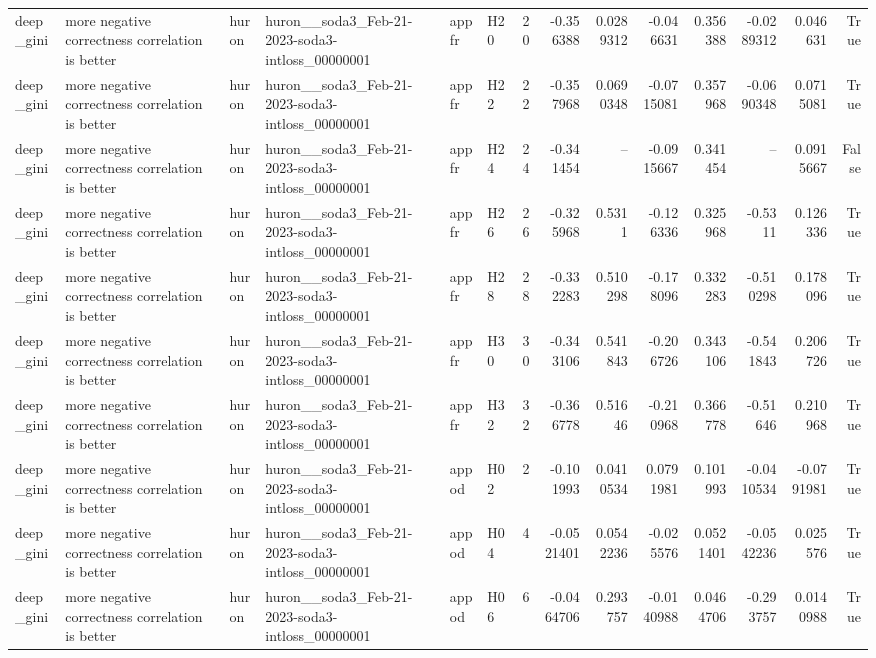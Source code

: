 \begin{longtable}{llllllrrrrrrrr}
deep\_gini & more negative correctness correlation is better & huron & huron\_\_soda3\_Feb-21-2023-soda3-intloss\_00000001 & appfr & H20 & 20 & -0.356388 & 0.0289312 & -0.046631 & 0.356388 & -0.0289312 & 0.046631 & True \\
deep\_gini & more negative correctness correlation is better & huron & huron\_\_soda3\_Feb-21-2023-soda3-intloss\_00000001 & appfr & H22 & 22 & -0.357968 & 0.0690348 & -0.0715081 & 0.357968 & -0.0690348 & 0.0715081 & True \\
deep\_gini & more negative correctness correlation is better & huron & huron\_\_soda3\_Feb-21-2023-soda3-intloss\_00000001 & appfr & H24 & 24 & -0.341454 & -- & -0.0915667 & 0.341454 & -- & 0.0915667 & False \\
deep\_gini & more negative correctness correlation is better & huron & huron\_\_soda3\_Feb-21-2023-soda3-intloss\_00000001 & appfr & H26 & 26 & -0.325968 & 0.5311 & -0.126336 & 0.325968 & -0.5311 & 0.126336 & True \\
deep\_gini & more negative correctness correlation is better & huron & huron\_\_soda3\_Feb-21-2023-soda3-intloss\_00000001 & appfr & H28 & 28 & -0.332283 & 0.510298 & -0.178096 & 0.332283 & -0.510298 & 0.178096 & True \\
deep\_gini & more negative correctness correlation is better & huron & huron\_\_soda3\_Feb-21-2023-soda3-intloss\_00000001 & appfr & H30 & 30 & -0.343106 & 0.541843 & -0.206726 & 0.343106 & -0.541843 & 0.206726 & True \\
deep\_gini & more negative correctness correlation is better & huron & huron\_\_soda3\_Feb-21-2023-soda3-intloss\_00000001 & appfr & H32 & 32 & -0.366778 & 0.51646 & -0.210968 & 0.366778 & -0.51646 & 0.210968 & True \\
deep\_gini & more negative correctness correlation is better & huron & huron\_\_soda3\_Feb-21-2023-soda3-intloss\_00000001 & appod & H02 & 2 & -0.101993 & 0.0410534 & 0.0791981 & 0.101993 & -0.0410534 & -0.0791981 & True \\
deep\_gini & more negative correctness correlation is better & huron & huron\_\_soda3\_Feb-21-2023-soda3-intloss\_00000001 & appod & H04 & 4 & -0.0521401 & 0.0542236 & -0.025576 & 0.0521401 & -0.0542236 & 0.025576 & True \\
deep\_gini & more negative correctness correlation is better & huron & huron\_\_soda3\_Feb-21-2023-soda3-intloss\_00000001 & appod & H06 & 6 & -0.0464706 & 0.293757 & -0.0140988 & 0.0464706 & -0.293757 & 0.0140988 & True \\

\end{longtable}

